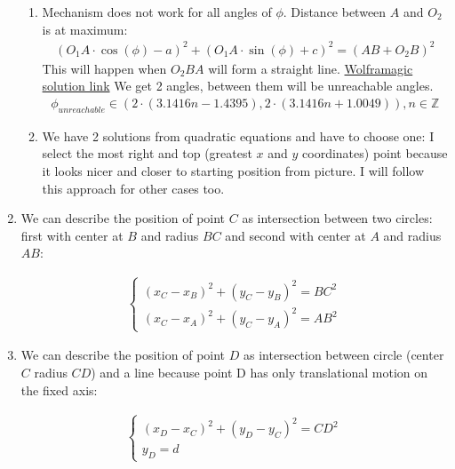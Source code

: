 \begin{enumerate}
\begin{enumerate}
              \item Mechanism does not work for all angles of $\phi$.
                    Distance between $A$ and $O_2$ is at maximum:
                    \begin{align}
                        (O_1A \cdot \cos(\phi) - a)^2 + (O_1A \cdot \sin(\phi) + c)^2 = (AB + O_2B)^2
                    \end{align}
                    This will happen when $O_2BA$ will form a straight line.
                    \href{https://www.wolframalpha.com/input?i=%2821+*+cos%28x%29+-+56%29%5E2+%2B+%2821+*+sin%28x%29+%2B+26%29%5E2+%3D+%2854+%2B+25%29%5E2}{Wolframagic solution link}
                    We get 2 angles, between them will be unreachable angles.
                    \begin{align}
                        \phi_{unreachable} \in \left(2 \cdot (3.1416 n - 1.4395), 2 \cdot (3.1416 n + 1.0049)\right), n \in \mathbb{Z}
                    \end{align}
              \item We have 2 solutions from quadratic equations and have to choose one:
                    I select the most right and top (greatest $x$ and $y$ coordinates) point because it looks nicer and closer to starting position from picture.
                    I will follow this approach for other cases too.
          \end{enumerate}

    \item We can describe the position of point $C$ as intersection between two circles: first with center at $B$ and radius $BC$ and second with center at $A$ and radius $AB$:
          \begin{answer}
              \begin{align}
                  \begin{cases}
                      (x_C - x_B)^2 + (y_C - y_B)^2 = BC^2 \\
                      (x_C - x_A)^2 + (y_C - y_A)^2 = AB^2
                  \end{cases}
              \end{align}
          \end{answer}

    \item We can describe the position of point $D$ as intersection between circle (center $C$ radius $CD$) and a line because point D has only translational motion on the fixed axis:
          \begin{answer}
              \begin{align}
                  \begin{cases}
                      (x_D - x_C)^2 + (y_D - y_C)^2 = CD^2 \\
                      y_D = d
                  \end{cases}
              \end{align}
          \end{answer}


\end{enumerate}
